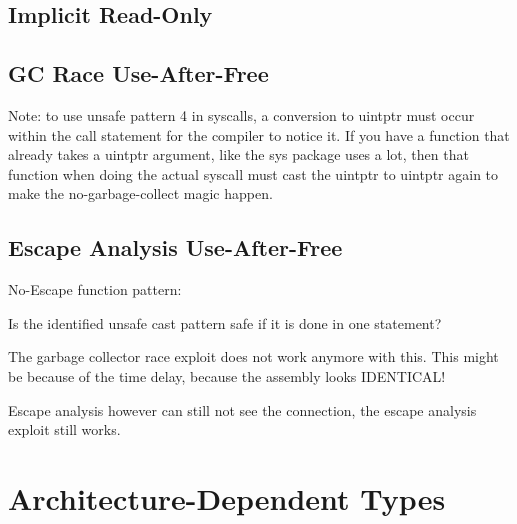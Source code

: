 \subsection{Implicit Read-Only}

\subsection{GC Race Use-After-Free}

Note: to use unsafe pattern 4 in syscalls, a conversion to uintptr must occur within the call statement for the compiler
to notice it.
If you have a function that already takes a uintptr argument, like the sys package uses a lot, then that function when
doing the actual syscall must cast the uintptr to uintptr again to make the no-garbage-collect magic happen.





\subsection{Escape Analysis Use-After-Free}

No-Escape function pattern:



Is the identified unsafe cast pattern safe if it is done in one statement?



The garbage collector race exploit does not work anymore with this.
This might be because of the time delay, because the assembly looks IDENTICAL!

Escape analysis however can still not see the connection, the escape analysis exploit still works.


\section{Architecture-Dependent Types}

